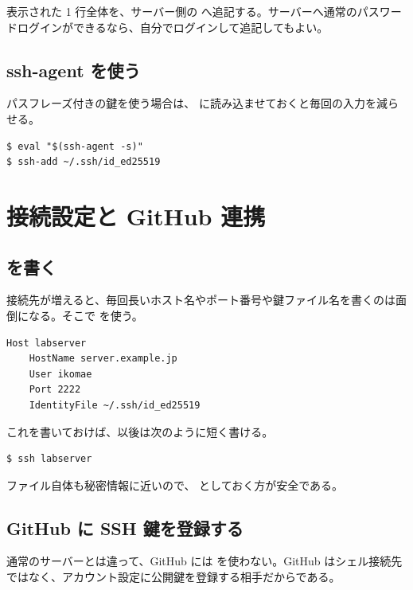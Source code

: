 表示された 1 行全体を、サーバー側の  へ追記する。サーバーへ通常のパスワードログインができるなら、自分でログインして追記してもよい。

\subsection{ssh-agent を使う}

パスフレーズ付きの鍵を使う場合は、 に読み込ませておくと毎回の入力を減らせる。

\begin{lstlisting}[numbers=none, xleftmargin=2\zw]
$ eval "$(ssh-agent -s)"
$ ssh-add ~/.ssh/id_ed25519
\end{lstlisting}

\section{接続設定と GitHub 連携}

\subsection{ を書く}

接続先が増えると、毎回長いホスト名やポート番号や鍵ファイル名を書くのは面倒になる。そこで  を使う。

\begin{lstlisting}[numbers=none, xleftmargin=2\zw]
Host labserver
    HostName server.example.jp
    User ikomae
    Port 2222
    IdentityFile ~/.ssh/id_ed25519
\end{lstlisting}

これを書いておけば、以後は次のように短く書ける。

\begin{lstlisting}[numbers=none, xleftmargin=2\zw]
$ ssh labserver
\end{lstlisting}

 ファイル自体も秘密情報に近いので、 としておく方が安全である。

\subsection{GitHub に SSH 鍵を登録する}

通常のサーバーとは違って、GitHub には  を使わない。GitHub はシェル接続先ではなく、アカウント設定に公開鍵を登録する相手だからである。

